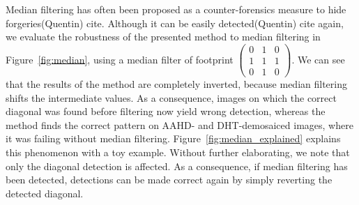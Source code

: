 \documentclass{ipol}
\newcommand{\qb}[1]{\textcolor{c1}{(Quentin) #1}}
\begin{document}
Median filtering has often been proposed as a counter-forensics measure to hide forgeries\qb{cite}. Although it can be easily detected\qb{cite again}, we evaluate the robustness of the presented method to median filtering in Figure~\ref{fig:median}, using a median filter of footprint $\left(\begin{smallmatrix}0&1&0\\1&1&1\\0&1&0\end{smallmatrix}\right)$. We can see that the results of the method are completely inverted, because median filtering shifts the intermediate values. As a consequence, images on which the correct diagonal was found before filtering now yield wrong detection, whereas the method finds the correct pattern on AAHD- and DHT-demosaiced images, where it was failing without median filtering. Figure~\ref{fig:median_explained} explains this phenomenon with a toy example. 
Without further elaborating, we note that only the diagonal detection is affected. As a consequence, if median filtering has been detected, detections can be made correct again by simply reverting the detected diagonal.
\end{document}
